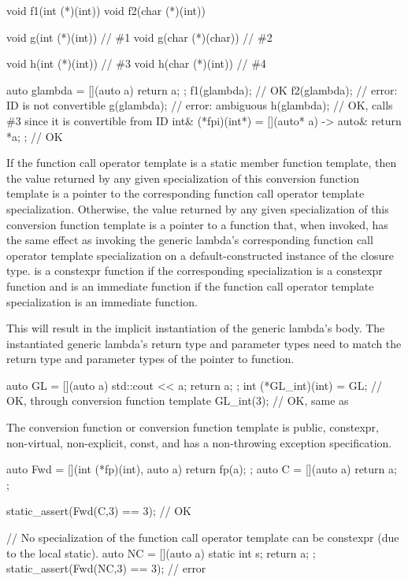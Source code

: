 \begin{example}
\begin{codeblock}
void f1(int (*)(int))   { }
void f2(char (*)(int))  { }

void g(int (*)(int))    { }     // \#1
void g(char (*)(char))  { }     // \#2

void h(int (*)(int))    { }     // \#3
void h(char (*)(int))   { }     // \#4

auto glambda = [](auto a) { return a; };
f1(glambda);                    // OK
f2(glambda);                    // error: ID is not convertible
g(glambda);                     // error: ambiguous
h(glambda);                     // OK, calls \#3 since it is convertible from ID
int& (*fpi)(int*) = [](auto* a) -> auto& { return *a; };        // OK
\end{codeblock}
\end{example}

\pnum
If the function call operator template is a static member function template,
then the value returned by
any given specialization of this conversion function template is
a pointer to the corresponding function call operator template specialization.
Otherwise,
the value returned by any given specialization of this conversion function
template is a pointer to a function  that, when invoked, has the same
effect as invoking the generic lambda's corresponding function call operator
template specialization on a default-constructed instance of the closure type.
 is a constexpr function
if the corresponding specialization is a constexpr function and
 is an immediate function
if the function call operator template specialization is an immediate function.
\begin{note}
This will result in the implicit instantiation of the generic lambda's body.
The instantiated generic lambda's return type and parameter types need to match
the return type and parameter types of the pointer to function.
\end{note}
\begin{example}
\begin{codeblock}
auto GL = [](auto a) { std::cout << a; return a; };
int (*GL_int)(int) = GL;        // OK, through conversion function template
GL_int(3);                      // OK, same as 
\end{codeblock}
\end{example}

\pnum
The conversion function or conversion function template is public,
constexpr, non-virtual, non-explicit, const, and has a non-throwing exception
specification.
\begin{example}
\begin{codeblock}
auto Fwd = [](int (*fp)(int), auto a) { return fp(a); };
auto C = [](auto a) { return a; };

static_assert(Fwd(C,3) == 3);   // OK

// No specialization of the function call operator template can be constexpr (due to the local static).
auto NC = [](auto a) { static int s; return a; };
static_assert(Fwd(NC,3) == 3);  // error
\end{codeblock}
\end{example}

